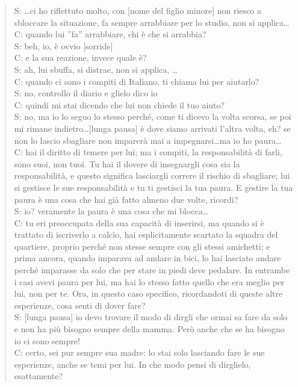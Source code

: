 \begin{verse}
S: \ldots ci ho riflettuto molto, con [nome del figlio minore] non riesco a sbloccare la situazione, fa sempre arrabbiare per lo studio, non si applica\ldots\\
C: quando lui ''fa'' arrabbiare, chi è che si arrabbia?\\
S: beh, io, è ovvio [sorride]\\
C: e la sua reazione, invece quale è?\\
S: ah, lui sbuffa, si distrae, non si applica, \ldots\\
C: quando ci sono i compiti di Italiano, ti chiama lui per aiutarlo?\\
S: no, controllo il diario e glielo dico io\\
C: quindi mi stai dicendo che lui non chiede il tuo aiuto?\\
S: no, ma io lo seguo lo stesso perché, come ti dicevo la volta scorsa, se poi mi rimane indietro\ldots [lunga pausa] è dove siamo arrivati l'altra volta, eh? se non lo lascio sbagliare non imparerà mai a impegnarsi\ldots ma io ho paura\ldots\\
C: hai il diritto di temere per lui; ma i compiti, la responsabilità di farli, sono suoi, non tuoi. Tu hai il dovere di insegnargli cosa sia la responsabilità, e questo significa lasciargli correre il rischio di sbagliare; lui si gestisce le sue responsabilità e tu ti gestisci la tua paura. E gestire la tua paura è una cosa che hai già fatto almeno due volte, ricordi?\\
S: io? veramente la paura è una cosa che mi blocca\ldots\\
C: tu eri preoccupata della sua capacità di inserirsi, ma quando si è trattato di iscriverlo a calcio, hai esplicitamente scartato la squadra del quartiere, proprio perché non stesse sempre con gli stessi amichetti; e prima ancora, quando imparava ad andare in bici,  lo hai lasciato andare perché imparasse da solo che per stare in piedi deve pedalare. In entrambe i casi avevi paura per lui, ma hai lo stesso fatto quello che era meglio per lui, non per te. Ora, in questo caso specifico, ricordandoti di queste altre esperienze, cosa senti di dover fare?\\
S: [lunga pausa] io devo trovare il modo di dirgli che ormai sa fare da solo e non ha più bisogno sempre della mamma. Però anche che se ha bisogno io ci sono sempre!\\
C: certo, sei pur sempre sua madre: lo stai solo lasciando fare le sue esperienze, anche se temi per lui. In che modo pensi di dirglielo, esattamente?\\

\end{verse}
